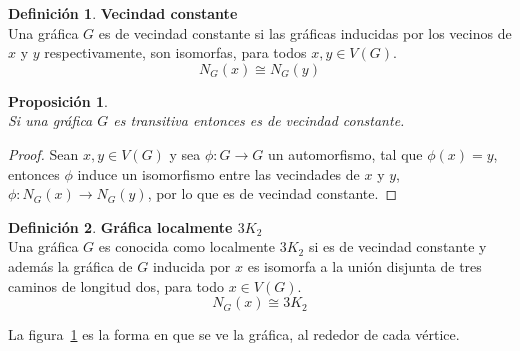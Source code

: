 \documentclass[11pt]{book}
\newtheorem{proposition}{Proposición}
\theoremstyle{definition}
\newtheorem{definition}{Definición}
\begin{document}
\begin{definition}\textbf{Vecindad constante}\\
  Una gráfica $G$ es de vecindad constante si las gráficas inducidas por los vecinos de $x$ y $y$ respectivamente, son isomorfas, para todos $x, y \in V(G)$.
$$N_G(x)\cong N_G(y)$$
\end{definition}


\begin{proposition}\textbf{}\\
  Si una gráfica $G$ es transitiva entonces es de vecindad constante.
\end{proposition}

\begin{proof} Sean $x,y \in V(G)$ y sea $\phi: G \rightarrow G $ un
automorfismo, tal que $\phi(x)=y$, entonces $\phi$ induce un
isomorfismo entre las vecindades de $x$ y $y$, $\phi: N_G(x)
\rightarrow N_G(y) $, por lo que es de vecindad constante.
\end{proof}

\begin{definition}\textbf{Gráfica localmente $3K_2$}\\
  Una gráfica $G$ es conocida como localmente $3K_2$ si es de vecindad
  constante y además la gráfica de $G$ inducida por $x$ es isomorfa a la unión disjunta de tres caminos de longitud dos, para todo $x\in V(G)$.
$$N_G(x)\cong 3K_2$$
\end{definition}

La figura~\ref{loc} es la forma en que se ve la gráfica, al rededor de
cada vértice.

\begin{figure}
  \centering
  \caption{}\label{loc}
\end{figure}
\end{document}
